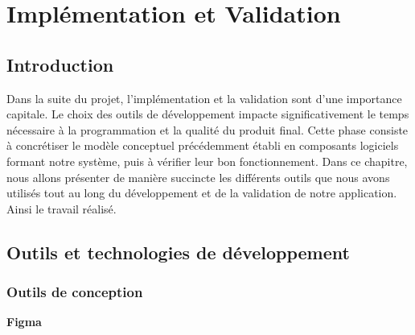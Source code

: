 




\chapter{Implémentation et Validation}
\pagestyle{chapterstyle}


\newpage
\vspace{1cm}

\section{Introduction}
Dans la suite du projet, l'implémentation et la validation 
sont d'une importance capitale. Le choix des outils de 
développement impacte significativement le temps nécessaire à 
la programmation et la qualité du produit final. Cette phase 
consiste à concrétiser le modèle conceptuel précédemment établi 
en composants logiciels formant notre système, puis à vérifier 
leur bon fonctionnement. Dans ce chapitre, nous allons présenter 
de manière succincte les différents outils que nous avons utilisés 
tout au long du développement et de la validation de notre 
application.
Ainsi le travail réalisé.
\section{Outils et technologies de développement}
\subsection{Outils de conception}

\large 
\textbf{Figma}

